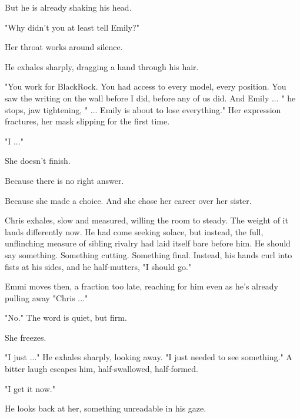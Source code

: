 But he is already shaking his head.  

\smallskip

"Why didn’t you at least tell Emily?"  

\smallskip

Her throat works around silence.  

\smallskip

He exhales sharply, dragging a hand through his hair.  

\smallskip

"You work for BlackRock. You had access to every model, every position. You saw the writing on the wall before I did, before any of us did. And Emily ... " he stops, jaw tightening, " ... Emily is about to lose everything." Her expression fractures, her mask slipping for the first time.  

"I ..."

\smallskip

She doesn’t finish.  

\smallskip

Because there is no right answer.  

\smallskip

Because she made a choice. And she chose her career over her sister.  

\smallskip

Chris exhales, slow and measured, willing the room to steady. The weight of it lands differently now. He had come seeking solace, but instead, the full, unflinching measure of sibling rivalry had laid itself bare before him. He should say something. Something cutting. Something final. Instead, his hands curl into fists at his sides, and he half-mutters,  "I should go."

\smallskip  

Emmi moves then, a fraction too late, reaching for him even as he’s already pulling away "Chris ..."

"No." The word is quiet, but firm.  

She freezes.  

\smallskip  

"I just ..." He exhales sharply, looking away. "I just needed to see something." A bitter laugh escapes him, half-swallowed, half-formed.  
\smallskip  

"I get it now."

\smallskip  

He looks back at her, something unreadable in his gaze.  

\smallskip  

